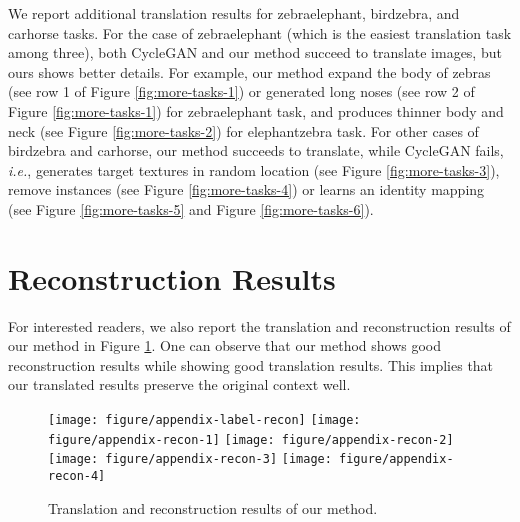 \documentclass{article} \usepackage{iclr2019_conference,times}
\begin{document}
We report additional translation results for zebraelephant, birdzebra, and carhorse tasks.
For the case of zebraelephant (which is the easiest translation task among three),
both CycleGAN and our method succeed to translate images, but ours shows better details.
For example, our method expand the body of zebras (see row 1 of Figure \ref{fig:more-tasks-1})
or generated long noses (see row 2 of Figure \ref{fig:more-tasks-1}) for zebraelephant task,
and produces thinner body and neck (see Figure \ref{fig:more-tasks-2}) for elephantzebra task.
For other cases of birdzebra and carhorse,
our method succeeds to translate, while CycleGAN fails,
\textit{i.e.}, generates target textures in random location (see Figure \ref{fig:more-tasks-3}),
remove instances (see Figure \ref{fig:more-tasks-4})
or learns an identity mapping (see Figure \ref{fig:more-tasks-5} and Figure \ref{fig:more-tasks-6}).
\fi






\newpage
\section{Reconstruction Results}

For interested readers, we also report the translation and reconstruction results of our method in Figure
\ref{fig:recon}. One can observe that 
our method shows good reconstruction results while showing good translation results.
This implies that our translated results preserve the original context well.




\begin{figure}[H]
	\centering
	\texttt{[image: figure/appendix-label-recon]}
	\texttt{[image: figure/appendix-recon-1]}
    \texttt{[image: figure/appendix-recon-2]}
    \texttt{[image: figure/appendix-recon-3]}
    \texttt{[image: figure/appendix-recon-4]}
	\caption{
	Translation and reconstruction results of our method.
	} \label{fig:recon}
\end{figure} 
\end{document}
